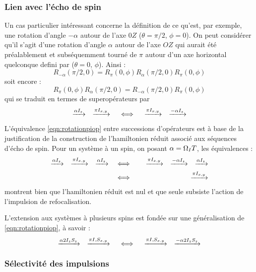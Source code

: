 \subsubsection{Lien avec l'écho de spin}
Un cas particulier intéressant concerne la définition de ce qu'est, par exemple,
une rotation d'angle $-\alpha$ autour de l'axe $0Z$ ($\theta=\pi/2$, $\phi=0$).
On peut considérer qu'il s'agit d'une rotation d'angle $\alpha$ autour de l'axe $OZ$
qui aurait été préalablement et subséquemment tourné de $\pi$ autour d'un axe horizontal
quelconque defini par ($\theta=0$, $\phi$). Ainsi :
\begin{equation}
\label{eqn:rotationpi}
R_{-\alpha}(\pi/2, 0)
= 
R_{\pi}(0, \phi)
R_{\alpha}(\pi/2,0)
R_{\pi}(0, \phi)
\end{equation}
soit encore :
\begin{equation}
\label{eqn:rotationpi2}
R_{\pi}(0, \phi)
R_{\alpha}(\pi/2, 0)
=
R_{-\alpha}(\pi/2,0)
R_{\pi}(0, \phi)
\end{equation}
qui se traduit en termes de superopérateurs par
\begin{equation}
\label{eqn:rotationpiop}
\xrightarrow{\alpha I_z}
\quad
\xrightarrow{\pi I_{x,y}}
\quad \mbox{$\iff$} \quad
\xrightarrow{\pi I_{x,y}}
\quad
\xrightarrow{-\alpha I_z}
\end{equation}

L'équivalence \ref{eqn:rotationpiop}
entre successions d'opérateurs est à base de la justification 
de la construction de l'hamiltonien réduit associé aux séquences d'écho de spin.
Pour un système à un spin, on posant $\alpha = \Omega_I T$, les équivalences :
\begin{eqnarray}
\xrightarrow{\alpha I_z}
\quad
\xrightarrow{\pi I_{x,y}}
\quad
\xrightarrow{\alpha I_z}
& \quad \mbox{$\iff$} \quad &
\xrightarrow{\pi I_{x,y}}
\quad
\xrightarrow{-\alpha I_z}
\quad
\xrightarrow{\alpha I_z} \\
& \quad \mbox{$\iff$} \quad &
\xrightarrow{\pi I_{x,y}}
\end{eqnarray}
montrent bien que l'hamiltonien réduit est nul et que seule
subsiste l'action de l'impulsion de refocalisation.

L'extension aux systèmes à plusieurs spins est fondée sur une
généralisation de \ref{eqn:rotationpiop}, à savoir :
\begin{equation}
\label{eqn:rotationpiopzz}
\xrightarrow{\alpha 2I_zS_z}
\quad
\xrightarrow{\pi I,S_{x,y}}
\quad \mbox{$\iff$} \quad
\xrightarrow{\pi I,S_{x,y}}
\quad
\xrightarrow{-\alpha 2I_zS_z}
\end{equation}

\subsubsection{Sélectivité des impulsions}


